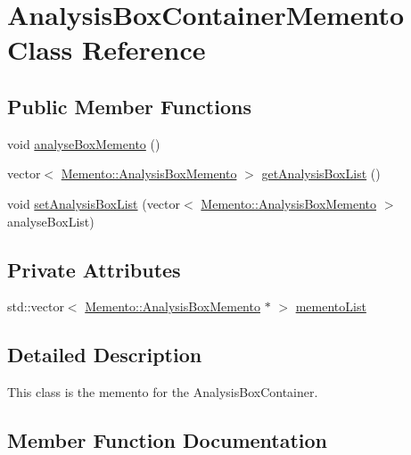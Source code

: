 \hypertarget{classMemento_1_1AnalysisBoxContainerMemento}{}\section{Analysis\+Box\+Container\+Memento Class Reference}
\label{classMemento_1_1AnalysisBoxContainerMemento}
\subsection*{Public Member Functions}
\begin{DoxyCompactItemize}
\item 
void \hyperlink{classMemento_1_1AnalysisBoxContainerMemento_a93c3e248eed6b6359984e54bdc3a560d}{analyse\+Box\+Memento} ()
\item 
vector$<$ \hyperlink{classMemento_1_1AnalysisBoxMemento}{Memento\+::\+Analysis\+Box\+Memento} $>$ \hyperlink{classMemento_1_1AnalysisBoxContainerMemento_a8b5776381bcb34875736a6436e848112}{get\+Analysis\+Box\+List} ()
\item 
void \hyperlink{classMemento_1_1AnalysisBoxContainerMemento_ae30e2212bcd429eebd5482a07d85397c}{set\+Analysis\+Box\+List} (vector$<$ \hyperlink{classMemento_1_1AnalysisBoxMemento}{Memento\+::\+Analysis\+Box\+Memento} $>$ analyse\+Box\+List)
\end{DoxyCompactItemize}
\subsection*{Private Attributes}
\begin{DoxyCompactItemize}
\item 
std\+::vector$<$ \hyperlink{classMemento_1_1AnalysisBoxMemento}{Memento\+::\+Analysis\+Box\+Memento} $\ast$ $>$ \hyperlink{classMemento_1_1AnalysisBoxContainerMemento_aa6b5ae88f477f23cf3377bd72c2c7bdc}{memento\+List}
\end{DoxyCompactItemize}


\subsection{Detailed Description}
This class is the memento for the Analysis\+Box\+Container. 

\subsection{Member Function Documentation}
\hypertarget{classMemento_1_1AnalysisBoxContainerMemento_a93c3e248eed6b6359984e54bdc3a560d}{}
